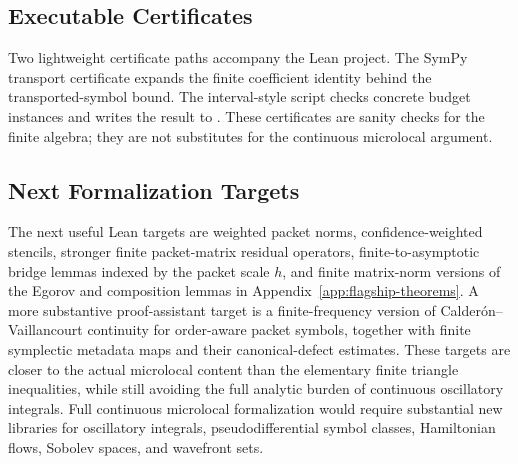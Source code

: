 \subsection{Executable Certificates}

Two lightweight certificate paths accompany the Lean project.  The SymPy transport certificate expands the finite coefficient identity behind the transported-symbol bound.  The interval-style script checks concrete budget instances and writes the result to .  These certificates are sanity checks for the finite algebra; they are not substitutes for the continuous microlocal argument.

\subsection{Next Formalization Targets}

The next useful Lean targets are weighted packet norms, confidence-weighted stencils, stronger finite packet-matrix residual operators, finite-to-asymptotic bridge lemmas indexed by the packet scale $h$, and finite matrix-norm versions of the Egorov and composition lemmas in Appendix~\ref{app:flagship-theorems}.  A more substantive proof-assistant target is a finite-frequency version of Calder\'on--Vaillancourt continuity for order-aware packet symbols, together with finite symplectic metadata maps and their canonical-defect estimates.  These targets are closer to the actual microlocal content than the elementary finite triangle inequalities, while still avoiding the full analytic burden of continuous oscillatory integrals. Full continuous microlocal formalization would require substantial new libraries for oscillatory integrals, pseudodifferential symbol classes, Hamiltonian flows, Sobolev spaces, and wavefront sets.
